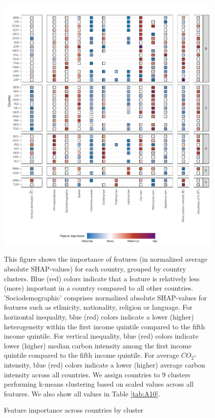 \documentclass[12pt, a4paper]{article}
\newenvironment{subcaption}
{\strut
\vspace{-5pt}
\begin{minipage}[b]{0.9\textwidth}
  \hspace*{-\parindent}
  \footnotesize}
 {\end{minipage}}
\begin{document}
\begin{figure}[ht!]
    \centering
    \includegraphics{Figure 4/Figure_4_Corrected_2}
    \caption{Feature importance across countries by cluster}
    \label{fig:fig_4_2}
    \begin{subcaption}
    This figure shows the importance of features (in normalized average absolute SHAP-values) for each country, grouped by country clusters. Blue (red) colors indicate that a feature is relatively less (more) important in a country compared to all other countries. 'Sociodemographic' comprises normalized absolute SHAP-values for features such as ethnicity, nationality, religion or language.
    For horizontal inequality, blue (red) colors indicate a lower (higher) heterogeneity within the first income quintile compared to the fifth income quintile. For vertical inequality, blue (red) colors indicate lower (higher) median carbon intensity among the first income quintile compared to the fifth income quintile. For average $CO_{2}$-intensity, blue (red) colors indicate a lower (higher) average carbon intensity across all countries.
    We assign countries to 9 clusters performing k-means clustering based on scaled values across all features. We also show all values in Table \ref{tab:A10}.
    \end{subcaption}
\end{figure}
\end{document}
